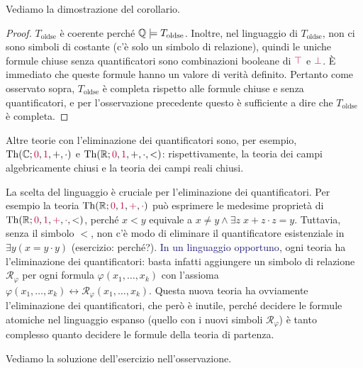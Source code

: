 Vediamo la dimostrazione del corollario.

\begin{proof}
    $T_{\text{oldse}}$ è coerente perché $\mathbb Q \models T_{\text{oldse}}$. Inoltre, nel linguaggio di $T_{\text{oldse}}$,
    non ci sono simboli di costante (c'è solo un simbolo di relazione), quindi le uniche formule chiuse senza quantificatori sono 
    combinazioni booleane di $\textcolor{purple}{\top}$ e $\textcolor{purple}{\bot}$. È immediato che queste formule
    hanno un valore di verità definito. Pertanto come osservato sopra, $T_{\text{oldse}}$ è completa rispetto alle formule chiuse e senza quantificatori, e per l'osservazione precedente questo è sufficiente a dire che $T_{\text{oldse}}$ è completa.
\end{proof}

\enlargethispage{8.825mm}

Altre teorie con l'eliminazione dei quantificatori sono, per esempio, $\operatorname{Th}(\mathbb C;\textcolor{purple}{0},\textcolor{purple}{1},+,\cdot)$ e $\operatorname{Th}(\mathbb R;\textcolor{purple}{0},\textcolor{purple}{1},+,\cdot,<)$:
rispettivamente, la teoria dei campi algebricamente chiusi e la teoria dei campi reali chiusi.

\begin{note}
    La scelta del linguaggio è cruciale per l'eliminazione dei quantificatori. Per esempio la teoria $\operatorname{Th}(\mathbb R;\textcolor{purple}{0},\textcolor{purple}{1},\textcolor{purple}{+},\textcolor{purple}{\cdot})$ può
    esprimere le medesime proprietà di $\operatorname{Th}(\mathbb R;\textcolor{purple}{0},\textcolor{purple}{1},\textcolor{purple}{+},\textcolor{purple}{\cdot},<)$, perché $x < y$ equivale a $x \ne y \land \exists z \; x + z\cdot z = y$.
    Tuttavia, senza il simbolo $<$, non c'è modo di eliminare il quantificatore esistenziale in $\exists y (x = y \cdot y)$ (esercizio: perché?). \textcolor{MidnightBlue}{In un linguaggio opportuno}, ogni teoria ha
    l'eliminazione dei quantificatori: basta infatti aggiungere un simbolo di relazione $\mathcal R_\varphi$ per ogni formula $\varphi(x_1,\ldots,x_k)$ con l'assioma $\varphi(x_1,\ldots,x_k) \leftrightarrow \mathcal R_\varphi(x_1,\ldots,x_k)$.
    Questa nuova teoria ha ovviamente l'eliminazione dei quantificatori, che però è inutile, perché decidere le formule atomiche nel linguaggio espanso (quello con i nuovi simboli $\mathcal R_\varphi$) è tanto complesso quanto decidere le formule della teoria di partenza.
\end{note}

Vediamo la soluzione dell'esercizio nell'osservazione.

